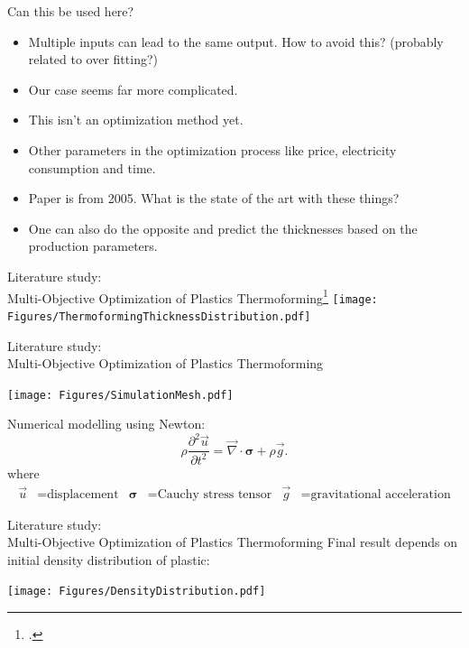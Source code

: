 \documentclass{beamer}
\begin{document}
	\begin{frame}{Can this be used here?}
		\begin{itemize}
			\item Multiple inputs can lead to the same output. How to avoid this? (probably related to over fitting?)
			\pause
			\item Our case seems far more complicated.
			\pause
			\item This isn't an optimization method yet.
			\pause
			\item Other parameters in the optimization process like price, electricity consumption and time.
			\pause
			\item Paper is from 2005. What is the state of the art with these things?
			\pause
			\item One can also do the opposite and predict the thicknesses based on the production parameters.
		\end{itemize}
	\end{frame}

	\begin{frame}{Literature study:\\ Multi-Objective Optimization of Plastics Thermoforming\footcite{math9151760}}
		\centering
		\texttt{[image: Figures/ThermoformingThicknessDistribution.pdf]}
	\end{frame}

	\begin{frame}{Literature study:\\ Multi-Objective Optimization of Plastics Thermoforming}
		\begin{center}
			\texttt{[image: Figures/SimulationMesh.pdf]}
		\end{center}
		Numerical modelling using Newton:
		\[\rho\frac{\partial^2\vec{u}}{\partial t^2}=\vec{\nabla}\cdot \boldsymbol{\sigma}+\rho \vec{g}.\]
	where
	\begin{align*}
		\vec{u}&=\text{displacement}&\boldsymbol{\sigma}&=\text{Cauchy stress tensor}&\vec{g}&=\text{gravitational acceleration}
	\end{align*}
	\end{frame}

	\begin{frame}{Literature study:\\ Multi-Objective Optimization of Plastics Thermoforming}
		Final result depends on initial density distribution of plastic:
		\begin{center}
			\texttt{[image: Figures/DensityDistribution.pdf]}
		\end{center}
	\end{frame}
\end{document}
